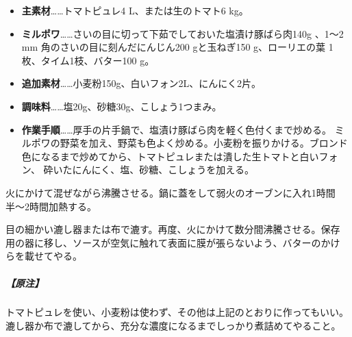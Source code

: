 \begin{recette}
\begin{itemize}
\item
  \textbf{主素材}\ldots{}\ldots{}トマトピュレ4 L、または生のトマト6 kg。
\item
  \textbf{ミルポワ}\ldots{}\ldots{}さいの目に切って下茹でしておいた塩漬け豚ばら肉140g
  、1〜2 mm 角のさいの目に刻んだにんじん200 gと玉ねぎ150 g、ローリエの葉
  1枚、タイム1枝、バター100 g。
\item
  \textbf{追加素材}\ldots{}\ldots{}小麦粉150g、白いフォン2L、にんにく2片。
\item
  \textbf{調味料}\ldots{}\ldots{}塩20g、砂糖30g、こしょう1つまみ。
\item
  \textbf{作業手順}\ldots{}\ldots{}厚手の片手鍋で、塩漬け豚ばら肉を軽く色付くまで炒める。
  ミルポワの野菜を加え、野菜も色よく炒める。小麦粉を振りかける。ブロンド
  色になるまで炒めてから、トマトピュレまたは潰した生トマトと白いフォン、
  砕いたにんにく、塩、砂糖、こしょうを加える。
\end{itemize}

火にかけて混ぜながら沸騰させる。鍋に蓋をして弱火のオーブンに入れ1時間
半〜2時間加熱する。

目の細かい漉し器または布で漉す。再度、火にかけて数分間沸騰させる。保存
用の器に移し、ソースが空気に触れて表面に膜が張らないよう、バターのかけ
らを載せてやる。

\hypertarget{ux539fux6ce8-4}{%
\subparagraph{【原注】}\label{ux539fux6ce8-4}}

トマトピュレを使い、小麦粉は使わず、その他は上記のとおりに作ってもいい。
漉し器か布で漉してから、充分な濃度になるまでしっかり煮詰めてやること。
\end{recette}